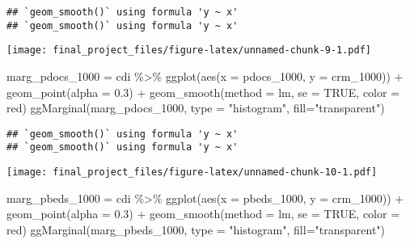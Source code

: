 \documentclass[
]{article}
\newenvironment{Shaded}{\begin{snugshade}}{\end{snugshade}}
\newcommand{\AttributeTok}[1]{\textcolor[rgb]{0.77,0.63,0.00}{#1}}
\newcommand{\ConstantTok}[1]{\textcolor[rgb]{0.00,0.00,0.00}{#1}}
\newcommand{\FloatTok}[1]{\textcolor[rgb]{0.00,0.00,0.81}{#1}}
\newcommand{\FunctionTok}[1]{\textcolor[rgb]{0.00,0.00,0.00}{#1}}
\newcommand{\NormalTok}[1]{#1}
\newcommand{\OtherTok}[1]{\textcolor[rgb]{0.56,0.35,0.01}{#1}}
\newcommand{\SpecialCharTok}[1]{\textcolor[rgb]{0.00,0.00,0.00}{#1}}
\newcommand{\StringTok}[1]{\textcolor[rgb]{0.31,0.60,0.02}{#1}}
\begin{document}
\begin{verbatim}
## `geom_smooth()` using formula 'y ~ x'
## `geom_smooth()` using formula 'y ~ x'
\end{verbatim}

\texttt{[image: final\_project\_files/figure-latex/unnamed-chunk-9-1.pdf]}

\begin{Shaded}
\begin{Highlighting}[]
\NormalTok{marg\_pdocs\_1000 }\OtherTok{=}\NormalTok{ cdi }\SpecialCharTok{\%\textgreater{}\%} \FunctionTok{ggplot}\NormalTok{(}\FunctionTok{aes}\NormalTok{(}\AttributeTok{x =}\NormalTok{ pdocs\_1000, }\AttributeTok{y =}\NormalTok{ crm\_1000)) }\SpecialCharTok{+} \FunctionTok{geom\_point}\NormalTok{(}\AttributeTok{alpha =} \FloatTok{0.3}\NormalTok{) }\SpecialCharTok{+} \FunctionTok{geom\_smooth}\NormalTok{(}\AttributeTok{method =} \StringTok{\textquotesingle{}lm\textquotesingle{}}\NormalTok{, }\AttributeTok{se =} \ConstantTok{TRUE}\NormalTok{, }\AttributeTok{color =} \StringTok{\textquotesingle{}red\textquotesingle{}}\NormalTok{)}
\FunctionTok{ggMarginal}\NormalTok{(marg\_pdocs\_1000, }\AttributeTok{type =} \StringTok{"histogram"}\NormalTok{, }\AttributeTok{fill=}\StringTok{"transparent"}\NormalTok{)}
\end{Highlighting}
\end{Shaded}

\begin{verbatim}
## `geom_smooth()` using formula 'y ~ x'
## `geom_smooth()` using formula 'y ~ x'
\end{verbatim}

\texttt{[image: final\_project\_files/figure-latex/unnamed-chunk-10-1.pdf]}

\begin{Shaded}
\begin{Highlighting}[]
\NormalTok{marg\_pbeds\_1000 }\OtherTok{=}\NormalTok{ cdi }\SpecialCharTok{\%\textgreater{}\%} \FunctionTok{ggplot}\NormalTok{(}\FunctionTok{aes}\NormalTok{(}\AttributeTok{x =}\NormalTok{ pbeds\_1000, }\AttributeTok{y =}\NormalTok{ crm\_1000)) }\SpecialCharTok{+} \FunctionTok{geom\_point}\NormalTok{(}\AttributeTok{alpha =} \FloatTok{0.3}\NormalTok{) }\SpecialCharTok{+} \FunctionTok{geom\_smooth}\NormalTok{(}\AttributeTok{method =} \StringTok{\textquotesingle{}lm\textquotesingle{}}\NormalTok{, }\AttributeTok{se =} \ConstantTok{TRUE}\NormalTok{, }\AttributeTok{color =} \StringTok{\textquotesingle{}red\textquotesingle{}}\NormalTok{)}
\FunctionTok{ggMarginal}\NormalTok{(marg\_pbeds\_1000, }\AttributeTok{type =} \StringTok{"histogram"}\NormalTok{, }\AttributeTok{fill=}\StringTok{"transparent"}\NormalTok{)}
\end{Highlighting}
\end{Shaded}
\end{document}
